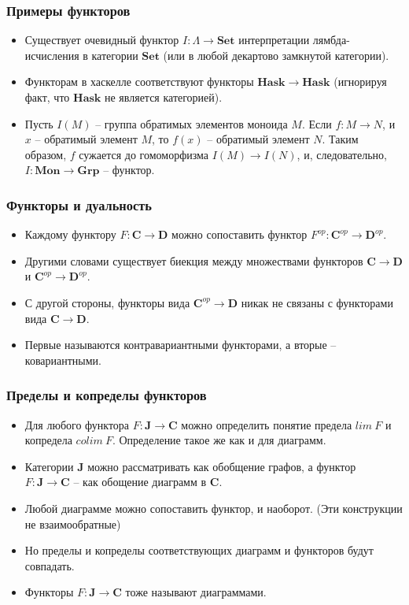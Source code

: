 \documentclass{beamer}
\theoremstyle{definition}
\newcommand{\cat}[1]{\mathbf{#1}}
\renewcommand{\C}{\cat{C}}
\newcommand{\D}{\cat{D}}
\newcommand{\Set}{\cat{Set}}
\newcommand{\Mon}{\cat{Mon}}
\newcommand{\Grp}{\cat{Grp}}
\newcommand{\Hask}{\cat{Hask}}
\begin{document}
\begin{frame}
\frametitle{Примеры функторов}
\begin{itemize}
\item Существует очевидный функтор  $I : \Lambda \to \Set$ интерпретации лямбда-исчисления в категории $\Set$ (или в любой декартово замкнутой категории).
\item Функторам в хаскелле соответствуют функторы $\Hask \to \Hask$ (игнорируя факт, что $\Hask$ не является категорией).
\item Пусть $I(M)$ -- группа обратимых элементов моноида $M$. Если $f : M \to N$, и $x$ -- обратимый элемент $M$, то $f(x)$ -- обратимый элемент $N$.
Таким образом, $f$ сужается до гомоморфизма $I(M) \to I(N)$, и, следовательно, $I : \Mon \to \Grp$ -- функтор.
\end{itemize}
\end{frame}

\begin{frame}
\frametitle{Функторы и дуальность}
\begin{itemize}
\item Каждому функтору $F : \C \to \D$ можно сопоставить функтор $F^{op} : \C^{op} \to \D^{op}$.
\item Другими словами существует биекция между множествами функторов $\C \to \D$ и $\C^{op} \to \D^{op}$.
\item С другой стороны, функторы вида $\C^{op} \to \D$ никак не связаны с функторами вида $\C \to \D$.
\item Первые называются контравариантными функторами, а вторые -- ковариантными.
\end{itemize}
\end{frame}

\begin{frame}
\frametitle{Пределы и копределы функторов}
\begin{itemize}
\item Для любого функтора $F : \cat{J} \to \C$ можно определить понятие предела $lim\ F$ и копредела $colim\ F$. Определение такое же как и для диаграмм.
\item Категории $\cat{J}$ можно рассматривать как обобщение графов, а функтор $F : \cat{J} \to \C$ -- как обощение диаграмм в $\C$.
\item Любой диаграмме можно сопоставить функтор, и наоборот. (Эти конструкции не взаимообратные)
\item Но пределы и копределы соответствующих диаграмм и функторов будут совпадать.
\item Функторы $F : \cat{J} \to \C$ тоже называют диаграммами.
\end{itemize}
\end{frame}
\end{document}
